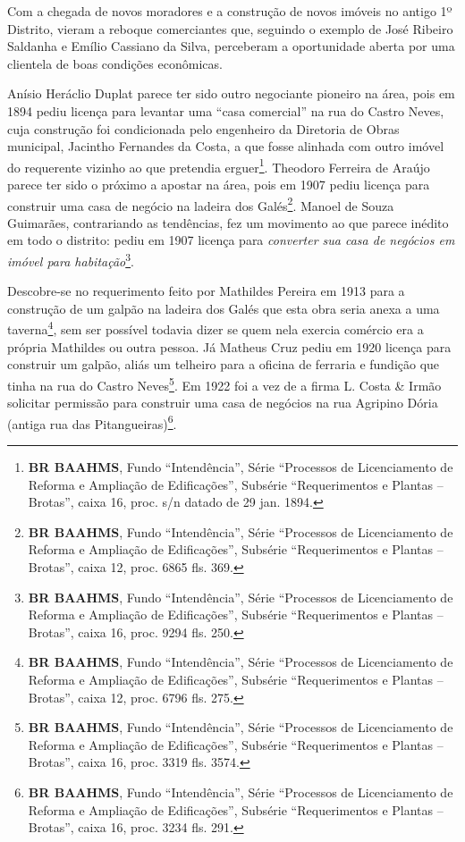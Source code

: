 
Com a chegada de novos moradores e a construção de novos imóveis no antigo 1º Distrito, vieram a reboque comerciantes que, seguindo o exemplo de José Ribeiro Saldanha e Emílio Cassiano da Silva, perceberam a oportunidade aberta por uma clientela de boas condições econômicas. 

Anísio Heráclio Duplat parece ter sido outro negociante pioneiro na área, pois em 1894 pediu licença para levantar uma ``casa comercial'' na rua do Castro Neves, cuja construção foi condicionada pelo engenheiro da Diretoria de Obras municipal, Jacintho Fernandes da Costa, a que fosse alinhada com outro imóvel do requerente vizinho ao que pretendia erguer\footnote{\textbf{BR BAAHMS}, Fundo ``Intendência'', Série ``Processos de Licenciamento de Reforma e Ampliação de Edificações'', Subsérie ``Requerimentos e Plantas -- Brotas'', caixa 16, proc. s/n datado de 29 jan. 1894.}. Theodoro Ferreira de Araújo parece ter sido o próximo a apostar na área, pois em 1907 pediu licença para construir uma casa de negócio na ladeira dos Galés\footnote{\textbf{BR BAAHMS}, Fundo ``Intendência'', Série ``Processos de Licenciamento de Reforma e Ampliação de Edificações'', Subsérie ``Requerimentos e Plantas -- Brotas'', caixa 12, proc. 6865 fls. 369.}. Manoel de Souza Guimarães, contrariando as tendências, fez um movimento ao que parece inédito em todo o distrito: pediu em 1907 licença para \textit{converter sua casa de negócios em imóvel para habitação}\footnote{\textbf{BR BAAHMS}, Fundo ``Intendência'', Série ``Processos de Licenciamento de Reforma e Ampliação de Edificações'', Subsérie ``Requerimentos e Plantas -- Brotas'', caixa 16, proc. 9294 fls. 250.}.

Descobre-se no requerimento feito por Mathildes Pereira em 1913 para a construção de um galpão na ladeira dos Galés que esta obra seria anexa a uma taverna\footnote{\textbf{BR BAAHMS}, Fundo ``Intendência'', Série ``Processos de Licenciamento de Reforma e Ampliação de Edificações'', Subsérie ``Requerimentos e Plantas -- Brotas'', caixa 12, proc. 6796 fls. 275.}, sem ser possível todavia dizer se quem nela exercia comércio era a própria Mathildes ou outra pessoa. Já Matheus Cruz pediu em 1920 licença para construir um galpão, aliás um telheiro para a oficina de ferraria e fundição que tinha na rua do Castro Neves\footnote{\textbf{BR BAAHMS}, Fundo ``Intendência'', Série ``Processos de Licenciamento de Reforma e Ampliação de Edificações'', Subsérie ``Requerimentos e Plantas -- Brotas'', caixa 16, proc. 3319 fls. 3574.}. Em 1922 foi a vez de a firma L. Costa \& Irmão solicitar permissão para construir uma casa de negócios na rua Agripino Dória (antiga rua das Pitangueiras)\footnote{\textbf{BR BAAHMS}, Fundo ``Intendência'', Série ``Processos de Licenciamento de Reforma e Ampliação de Edificações'', Subsérie ``Requerimentos e Plantas -- Brotas'', caixa 16, proc. 3234 fls. 291.}.

